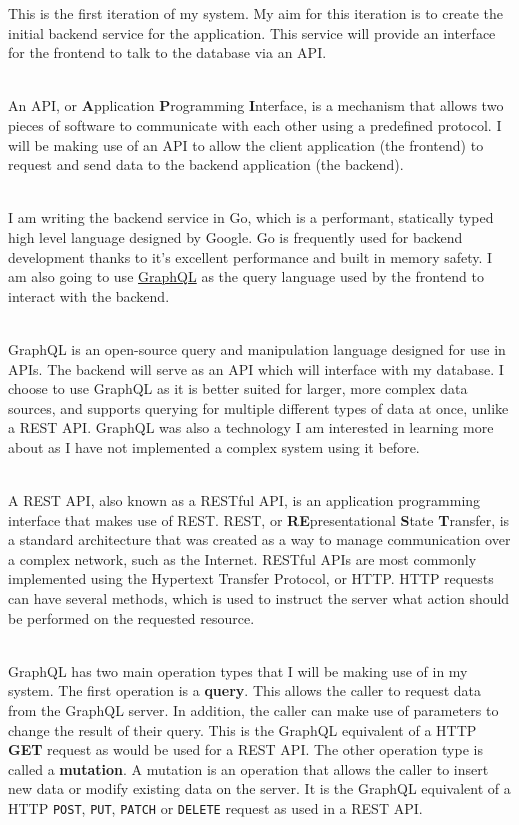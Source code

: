 \documentclass[../../main.tex]{subfiles}
\begin{document}
This is the first iteration of my system. My aim for this iteration is to create the initial backend service for the application.
This service will provide an interface for the frontend to talk to the database via an API.

\noindent \\ An API, or \textbf{A}pplication \textbf{P}rogramming \textbf{I}nterface, is a mechanism that allows two pieces of software to communicate with each other
using a predefined protocol. I will be making use of an API to allow the client application (the frontend) to request and send data to the backend application (the backend).

\noindent \\ I am writing the backend service in Go, which is a performant, statically typed high level language designed by Google.
Go is frequently used for backend development thanks to it's excellent performance and built in memory safety.
I am also going to use \underline{GraphQL} as the query language used by the frontend to interact with the backend.

\noindent \\ GraphQL is an open-source query and manipulation language designed for use in APIs. The backend will serve as an API which will interface
with my database.
I choose to use GraphQL as it is better suited for larger, more complex data sources, and supports querying for multiple different types of data at
once, unlike a REST API. GraphQL was also a technology I am interested in learning more about as I have not implemented a complex system using it before.

\noindent \\ A REST API, also known as a RESTful API, is an application programming interface that makes use of REST. REST, or \textbf{RE}presentational \textbf{S}tate \textbf{T}ransfer,
is a standard architecture that was created as a way to manage communication over a complex network, such as the Internet. RESTful APIs are most commonly implemented using
the Hypertext Transfer Protocol, or HTTP. HTTP requests can have several methods, which is used to instruct the server what action should be performed on the requested resource.

\noindent \\ GraphQL has two main operation types that I will be making use of in my system. The first operation is a \textbf{query}. This allows the caller to request
data from the GraphQL server. In addition, the caller can make use of parameters to change the result of their query. This is the GraphQL equivalent of
a HTTP \textbf{GET} request as would be used for a REST API. The other operation type is called a \textbf{mutation}. A mutation is an operation that
allows the caller to insert new data or modify existing data on the server. It is the GraphQL equivalent of a HTTP \lstinline{POST}, \lstinline{PUT},
\lstinline{PATCH} or \lstinline{DELETE} request as used in a REST API.
\end{document}
